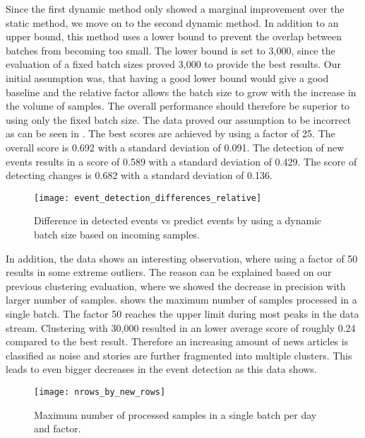 Since the first dynamic method only showed a marginal improvement over the static method,
we move on to the second dynamic method.
In addition to an upper bound, this method uses a lower bound
to prevent the overlap between batches from becoming too small.
The lower bound is set to 3,000, since the evaluation of a fixed batch sizes proved 3,000 to provide the best results.
Our initial assumption was, that having a good lower bound
would give a good baseline and the relative factor allows the batch size
to grow with the increase in the volume of samples.
The overall performance should therefore be superior to using only the fixed batch size.
The data proved our assumption to be incorrect as can be seen in .
The best scores are achieved by using a factor of 25.
The overall score is 0.692 with a standard deviation of 0.091.
The detection of new events results in a score of 0.589 with a standard deviation of 0.429.
The score of detecting changes is 0.682 with a standard deviation of 0.136.

\begin{figure}[h]
   \centering
   \texttt{[image: event\_detection\_differences\_relative]}
   \caption{Difference in detected events vs predict events by using a dynamic batch size based on incoming samples.}
   \label{fig:event_detection_differences_relative}
\end{figure}

In addition, the data shows an interesting observation, where using a factor of 50 results in some extreme outliers.
The reason can be explained based on our previous clustering evaluation,
where we showed the decrease in precision with larger number of samples.
 shows the maximum number of samples processed in a single batch.
The factor 50 reaches the upper limit during most peaks in the data stream.
Clustering with 30,000 resulted in an lower average score of roughly 0.24 compared to the best result.
Therefore an increasing amount of news articles is classified as noise and stories
are further fragmented into multiple clusters.
This leads to even bigger decreases in the event detection as this data shows.

\begin{figure}[h]
    \centering
    \texttt{[image: nrows\_by\_new\_rows]}
    \caption{Maximum number of processed samples in a single batch per day and factor.}
    \label{fig:nrows_by_new_rows}
 \end{figure}

